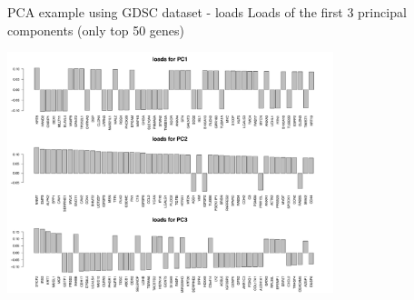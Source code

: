 \documentclass[notes]{beamer}          %
\begin{document}
\begin{frame}{PCA example using GDSC dataset - loads}
Loads of the first 3 principal components (only top 50 genes)
\begin{center}
\includegraphics[height=7cm]{../figures/week_6/GDSC_loadsPC123.pdf}  
\end{center}
\end{frame}
\end{document}
